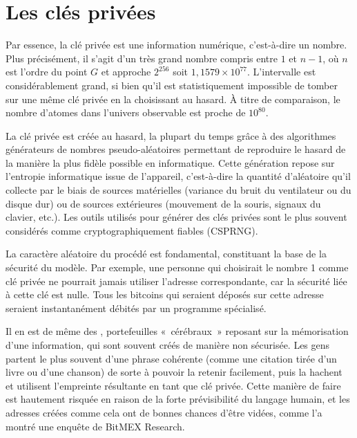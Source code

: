 \section*{Les clés privées}

Par essence, la clé privée est une information numérique, c'est-à-dire un nombre. Plus précisément, il s'agit d'un très grand nombre compris entre $1$ et $n-1$, où $n$ est l'ordre du point $G$ et approche $2^{256}$ soit $1,1579 \times 10^{77}$. L'intervalle est considérablement grand, si bien qu'il est statistiquement impossible de tomber sur une même clé privée en la choisissant au hasard. À titre de comparaison, le nombre d'atomes dans l'univers observable est proche de $10^{80}$.


La clé privée est créée au hasard, la plupart du temps grâce à des algorithmes générateurs de nombres pseudo-aléatoires permettant de reproduire le hasard de la manière la plus fidèle possible en informatique. Cette génération repose sur l'entropie informatique issue de l'appareil, c'est-à-dire la quantité d'aléatoire qu'il collecte par le biais de sources matérielles (variance du bruit du ventilateur ou du disque dur) ou de sources extérieures (mouvement de la souris, signaux du clavier, etc.). Les outils utilisés pour générer des clés privées sont le plus souvent considérés comme cryptographiquement fiables (CSPRNG). %

La caractère aléatoire du procédé est fondamental, constituant la base de la sécurité du modèle. Par exemple, une personne qui choisirait le nombre 1 comme clé privée ne pourrait jamais utiliser l'adresse correspondante, car la sécurité liée à cette clé est nulle. Tous les bitcoins qui seraient déposés sur cette adresse seraient instantanément débités par un programme spécialisé.

Il en est de même des , portefeuilles «~cérébraux~» reposant sur la mémorisation d'une information, qui sont souvent créés de manière non sécurisée. Les gens partent le plus souvent d'une phrase cohérente (comme une citation tirée d'un livre ou d'une chanson) de sorte à pouvoir la retenir facilement, puis la hachent et utilisent l'empreinte résultante en tant que clé privée. Cette manière de faire est hautement risquée en raison de la forte prévisibilité du langage humain, et les adresses créées comme cela ont de bonnes chances d'être vidées, comme l'a montré une enquête de BitMEX Research.

